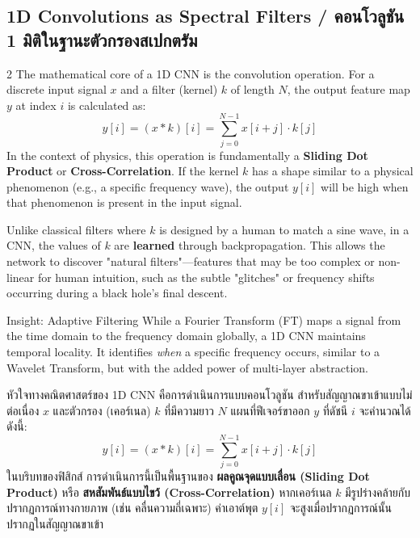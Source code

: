 \subsection{1D Convolutions as Spectral Filters \quad / \quad \textthai{คอนโวลูชัน 1 มิติในฐานะตัวกรองสเปกตรัม}}
\begin{paracol}{2}
The mathematical core of a 1D CNN is the convolution operation. For a discrete input signal $x$ and a filter (kernel) $k$ of length $N$, the output feature map $y$ at index $i$ is calculated as:
\begin{equation}
y[i] = (x * k)[i] = \sum_{j=0}^{N-1} x[i+j] \cdot k[j]
\end{equation}
In the context of physics, this operation is fundamentally a \textbf{Sliding Dot Product} or \textbf{Cross-Correlation}. If the kernel $k$ has a shape similar to a physical phenomenon (e.g., a specific frequency wave), the output $y[i]$ will be high when that phenomenon is present in the input signal.

Unlike classical filters where $k$ is designed by a human to match a sine wave, in a CNN, the values of $k$ are \textbf{learned} through backpropagation. This allows the network to discover "natural filters"—features that may be too complex or non-linear for human intuition, such as the subtle "glitches" or frequency shifts occurring during a black hole's final descent.

\begin{physbox}{Insight: Adaptive Filtering}
While a Fourier Transform (FT) maps a signal from the time domain to the frequency domain globally, a 1D CNN maintains temporal locality. It identifies \textit{when} a specific frequency occurs, similar to a Wavelet Transform, but with the added power of multi-layer abstraction.
\end{physbox}

\switchcolumn

\begin{thai}
หัวใจทางคณิตศาสตร์ของ 1D CNN คือการดำเนินการแบบคอนโวลูชัน สำหรับสัญญาณขาเข้าแบบไม่ต่อเนื่อง $x$ และตัวกรอง (เคอร์เนล) $k$ ที่มีความยาว $N$ แผนที่ฟีเจอร์ขาออก $y$ ที่ดัชนี $i$ จะคำนวณได้ดังนี้:
\begin{equation}
y[i] = (x * k)[i] = \sum_{j=0}^{N-1} x[i+j] \cdot k[j]
\end{equation}
ในบริบทของฟิสิกส์ การดำเนินการนี้เป็นพื้นฐานของ \textbf{ผลคูณจุดแบบเลื่อน (Sliding Dot Product)} หรือ \textbf{สหสัมพันธ์แบบไขว้ (Cross-Correlation)} หากเคอร์เนล $k$ มีรูปร่างคล้ายกับปรากฏการณ์ทางกายภาพ (เช่น คลื่นความถี่เฉพาะ) ค่าเอาต์พุต $y[i]$ จะสูงเมื่อปรากฏการณ์นั้นปรากฏในสัญญาณขาเข้า


\end{thai}
\end{paracol}
